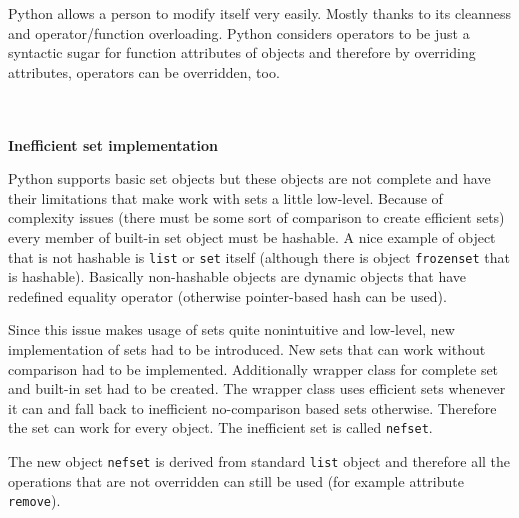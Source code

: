 \documentclass[11pt,oneside]{fithesis2}
\newcommand{\markit}[1]{\ \\\\{\noindent\textbf{#1}}}
\newcommand{\T}[1]{\texttt{#1}}
\begin{document}
Python allows a person to modify itself very easily. Mostly thanks to its cleanness and operator/function overloading. Python considers operators to be just a syntactic sugar for function attributes of objects and therefore by overriding attributes, operators can be overridden, too.

\markit{Inefficient set implementation}

Python supports basic set objects but these objects are not complete and have their limitations that make work with sets a little low-level. Because of complexity issues (there must be some sort of comparison to create efficient sets) every member of built-in set object must be hashable. A nice example of object that is not hashable is \T{list} or \T{set} itself (although there is object \T{frozenset} that is hashable). Basically non-hashable objects are dynamic objects that have redefined equality operator (otherwise pointer-based hash can be used).

Since this issue makes usage of sets quite nonintuitive and low-level, new implementation of sets had to be introduced. New sets that can work without comparison had to be implemented. Additionally wrapper class for complete set and built-in set had to be created. The wrapper class uses efficient sets whenever it can and fall back to inefficient no-comparison based sets otherwise. Therefore the set can work for every object. The inefficient set is called \T{nefset}.

The new object \T{nefset} is derived from standard \T{list} object and therefore all the operations that are not overridden can still be used (for example attribute \T{remove}).
\end{document}
